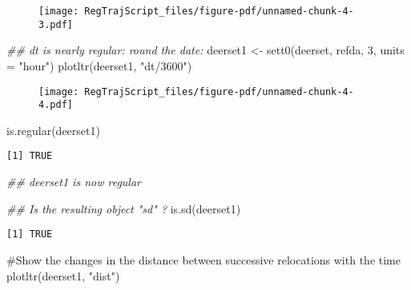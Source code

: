 \documentclass[
  letterpaper,
]{book}
\newenvironment{Shaded}{\begin{snugshade}}{\end{snugshade}}
\newcommand{\AttributeTok}[1]{\textcolor[rgb]{0.40,0.45,0.13}{#1}}
\newcommand{\CommentTok}[1]{\textcolor[rgb]{0.37,0.37,0.37}{#1}}
\newcommand{\DecValTok}[1]{\textcolor[rgb]{0.68,0.00,0.00}{#1}}
\newcommand{\DocumentationTok}[1]{\textcolor[rgb]{0.37,0.37,0.37}{\textit{#1}}}
\newcommand{\FunctionTok}[1]{\textcolor[rgb]{0.28,0.35,0.67}{#1}}
\newcommand{\NormalTok}[1]{\textcolor[rgb]{0.00,0.23,0.31}{#1}}
\newcommand{\OtherTok}[1]{\textcolor[rgb]{0.00,0.23,0.31}{#1}}
\newcommand{\StringTok}[1]{\textcolor[rgb]{0.13,0.47,0.30}{#1}}
\begin{document}
\begin{figure}[H]

{\centering \texttt{[image: RegTrajScript\_files/figure-pdf/unnamed-chunk-4-3.pdf]}

}

\end{figure}

\begin{Shaded}
\begin{Highlighting}[]
\DocumentationTok{\#\# dt is nearly regular: round the date:}
\NormalTok{deerset1 }\OtherTok{\textless{}{-}} \FunctionTok{sett0}\NormalTok{(deerset, refda, }\DecValTok{3}\NormalTok{, }\AttributeTok{units =} \StringTok{"hour"}\NormalTok{)}
\FunctionTok{plotltr}\NormalTok{(deerset1, }\StringTok{"dt/3600"}\NormalTok{)}
\end{Highlighting}
\end{Shaded}

\begin{figure}[H]

{\centering \texttt{[image: RegTrajScript\_files/figure-pdf/unnamed-chunk-4-4.pdf]}

}

\end{figure}

\begin{Shaded}
\begin{Highlighting}[]
\FunctionTok{is.regular}\NormalTok{(deerset1)}
\end{Highlighting}
\end{Shaded}

\begin{verbatim}
[1] TRUE
\end{verbatim}

\begin{Shaded}
\begin{Highlighting}[]
\DocumentationTok{\#\# deerset1 is now regular}

\DocumentationTok{\#\# Is the resulting object "sd" ?}
\FunctionTok{is.sd}\NormalTok{(deerset1)}
\end{Highlighting}
\end{Shaded}

\begin{verbatim}
[1] TRUE
\end{verbatim}

\begin{Shaded}
\begin{Highlighting}[]
\CommentTok{\#Show the changes in the distance between successive relocations with the time}
\FunctionTok{plotltr}\NormalTok{(deerset1, }\StringTok{"dist"}\NormalTok{)}
\end{Highlighting}
\end{Shaded}
\end{document}
